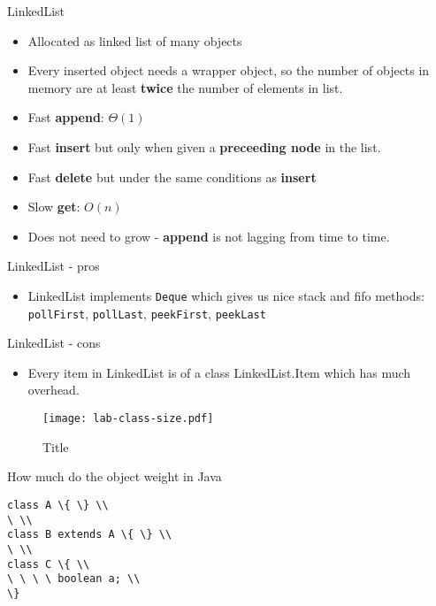 \documentclass{beamer}
\begin{document}
\begin{frame}{LinkedList}

\begin{itemize}
\item Allocated as linked list of many objects
\item Every inserted object needs a wrapper object, so the number of objects in memory are at least \textbf{twice} the number of elements in list.
\item Fast \textbf{append}: $\Theta(1)$
\item Fast \textbf{insert} but only when given a \textbf{preceeding node} in the list.
\item Fast \textbf{delete} but under the same conditions as \textbf{insert}
\item Slow \textbf{get}: $O(n)$
\item Does not need to grow - \textbf{append} is not lagging from time to time.
\end{itemize}

\end{frame}

\begin{frame}{LinkedList - pros}

\begin{itemize}
\item LinkedList implements \texttt{Deque} which gives us nice stack and fifo methods:
 \texttt{pollFirst}, \texttt{pollLast}, \texttt{peekFirst}, \texttt{peekLast}
\end{itemize}

\end{frame}

\begin{frame}{LinkedList - cons}

\begin{itemize}
\item Every item in LinkedList is of a class LinkedList.Item which has much overhead.
\end{itemize}
    \begin{figure}[htbp]
    \centering
        \texttt{[image: lab-class-size.pdf]}
    \caption{Title}
    \label{fig:lab-class-size}
    \end{figure}
\end{frame}

\begin{frame}[fragile]{How much do the object weight in Java}
    \begin{verbatim}
class A \{ \} \\
\ \\
class B extends A \{ \} \\
\ \\
class C \{ \\
\ \ \ \ boolean a; \\
\}
    \end{verbatim}
\end{frame}
\end{document}
